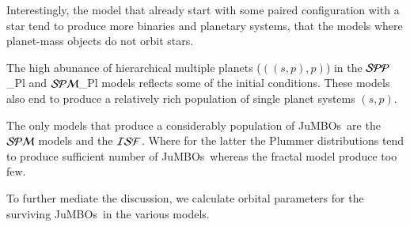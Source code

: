 \documentclass[submission,phys]{lib/SciPost}
\newcommand{\jumbos}{\mbox{JuMBOs}}
\begin{document}
Interestingly, the model that already start with some paired
configuration with a star tend to produce more binaries and planetary
systems, that the models where planet-mass objects do not orbit stars.

The high abunance of hierarchical multiple planets ($((s,p),p)$) in
the ${\cal SPP}$\_Pl and ${\cal SPM}$\_Pl models reflects some of the
initial conditions. These models also end to produce a relatively rich
population of single planet systems $(s,p)$.

The only models that produce a considerably population of \jumbos\,
are the ${\cal SPM}$ models and the ${\cal ISF}$. Where for the latter
the Plummer distributions tend to produce sufficient number of
\jumbos\, whereas the fractal model produce too few.

To further mediate the discussion, we calculate orbital parameters for
the surviving \jumbos\, in the various models.
\end{document}
